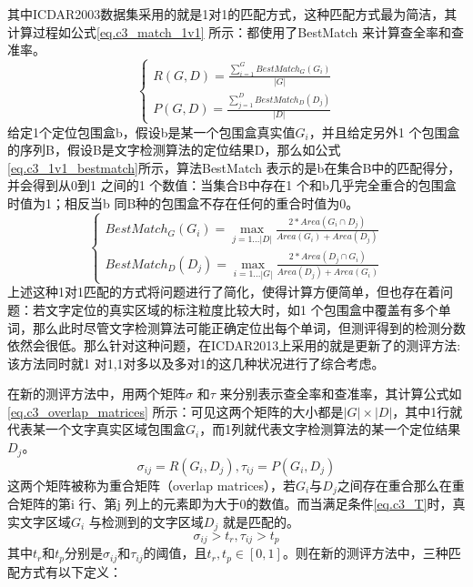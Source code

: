         其中ICDAR2003数据集采用的就是1对1的匹配方式\cite{Mariano2002Performance}，这种匹配方式最为简洁，其计算过程如公式\ref{eq.c3_match_1v1} 所示：都使用了BestMatch 来计算查全率和查准率。
        \begin{equation}
        \left\{
        \begin{array}{c}
        R(G,D)=\frac{\sum_{i=1}^GBestMatch_G(G_i)}{|G|}\\
        P(G,D)=\frac{\sum_{j=1}^DBestMatch_D(D_j)}{|D|}
        \end{array}
        \right.
        \label{eq.c3_match_1v1}
        \end{equation}
        给定1个定位包围盒b，假设b是某一个包围盒真实值$G_i$，并且给定另外1 个包围盒的序列B，假设B是文字检测算法的定位结果D，那么如公式\ref{eq.c3_1v1_bestmatch}所示，算法BestMatch 表示的是b在集合B中的匹配得分，并会得到从0到1 之间的1 个数值：当集合B中存在1 个和b几乎完全重合的包围盒时值为1；相反当b 同B种的包围盒不存在任何的重合时值为0。
        \begin{equation}
        \left\{
        \begin{array}{c}
        BestMatch_G(G_i)=\max_{j=1...|D|} \frac{2*Area(G_i \cap D_j)}{Area(G_i)+Area(D_j)}\\
        BestMatch_D(D_j)=\max_{i=1...|G|} \frac{2*Area(D_j \cap G_i)}{Area(D_j)+Area(G_i)}
        \end{array}
        \right.
        \label{eq.c3_1v1_bestmatch}
        \end{equation}
        上述这种1对1匹配的方式将问题进行了简化，使得计算方便简单，但也存在着问题：若文字定位的真实区域的标注粒度比较大时，如1 个包围盒中覆盖有多个单词，那么此时尽管文字检测算法可能正确定位出每个单词，但测评得到的检测分数依然会很低。那么针对这种问题，在ICDAR2013上采用的就是更新了的测评方法\cite{Wolf2006Object}:该方法同时就1 对1,1对多以及多对1的这几种状况进行了综合考虑。

        在新的测评方法中，用两个矩阵$\sigma$ 和$\tau$ 来分别表示查全率和查准率，其计算公式如\ref{eq.c3_overlap_matrices} 所示：可见这两个矩阵的大小都是$|G|\times|D|$，其中1行就代表某一个文字真实区域包围盒$G_i$，而1列就代表文字检测算法的某一个定位结果$D_j$。
        \begin{equation}
        \sigma_{ij}=R(G_i,D_j),\tau_{ij}=P(G_i,D_j)
        \label{eq.c3_overlap_matrices}
        \end{equation}
        这两个矩阵被称为重合矩阵（overlap matrices），若$G_i$与$D_j$之间存在重合那么在重合矩阵的第i 行、第j 列上的元素即为大于0的数值。而当满足条件\ref{eq.c3_T}时，真实文字区域$G_i$ 与检测到的文字区域$D_j$ 就是匹配的。
        \begin{equation}
        \sigma_{ij}>t_r,\tau_{ij}>t_p
        \label{eq.c3_T}
        \end{equation}
        其中$t_r$和$t_p$分别是$\sigma_{ij}$和$\tau_{ij}$的阈值，且$t_r,t_p \in [0,1]$。则在新的测评方法中，三种匹配方式有以下定义：

